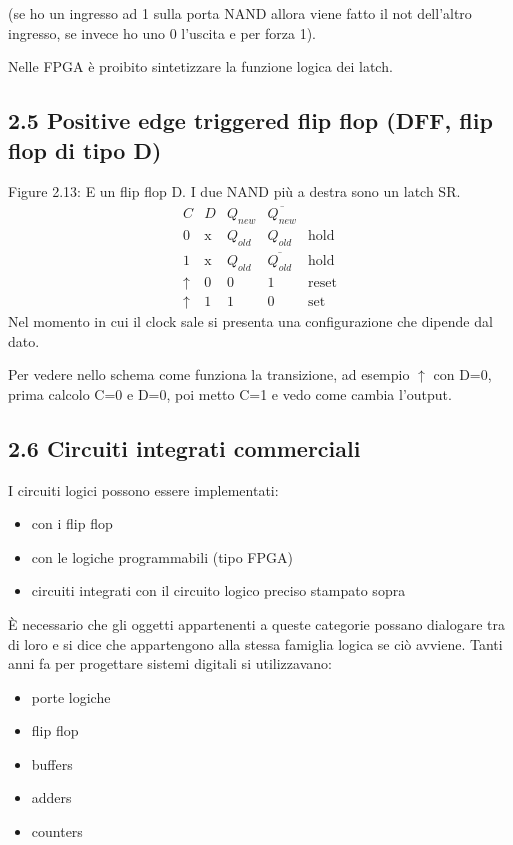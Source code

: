 \documentclass[
]{article}
\providecommand{\tightlist}{%
  \setlength{\itemsep}{0pt}\setlength{\parskip}{0pt}}
\begin{document}
(se ho un ingresso ad 1 sulla porta NAND allora viene fatto il not
dell'altro ingresso, se invece ho uno 0 l'uscita e per forza 1).

Nelle FPGA è proibito sintetizzare la funzione logica dei latch.

\subsection{2.5 Positive edge triggered flip flop (DFF, flip flop di
tipo
D)}\label{positive-edge-triggered-flip-flop-dff-flip-flop-di-tipo-d}

Figure 2.13: E un flip flop D. I due NAND più a destra sono un latch SR.
\[
\begin{array}{ccccc}
C&D&Q_{new}&\overline{Q_{new}}\\
\hline0&\text{x}&Q_{old}&Q_{old}&\text{hold}\\
1&\text{x}&Q_{old}&\overline{Q_{old}}&\text{hold}\\
\uparrow&0&0&1&\text{reset}\\
\uparrow&1&1&0&\text{set}
\end{array}
\] Nel momento in cui il clock sale si presenta una configurazione che
dipende dal dato.

Per vedere nello schema come funziona la transizione, ad esempio
\(\uparrow\) con D=0, prima calcolo C=0 e D=0, poi metto C=1 e vedo come
cambia l'output.

\subsection{2.6 Circuiti integrati
commerciali}\label{circuiti-integrati-commerciali}

I circuiti logici possono essere implementati:

\begin{itemize}
\tightlist
\item
  con i flip flop
\item
  con le logiche programmabili (tipo FPGA)
\item
  circuiti integrati con il circuito logico preciso stampato sopra
\end{itemize}

È necessario che gli oggetti appartenenti a queste categorie possano
dialogare tra di loro e si dice che appartengono alla stessa famiglia
logica se ciò avviene. Tanti anni fa per progettare sistemi digitali si
utilizzavano:

\begin{itemize}
\tightlist
\item
  porte logiche
\item
  flip flop
\item
  buffers
\item
  adders
\item
  counters
\end{itemize}
\end{document}
